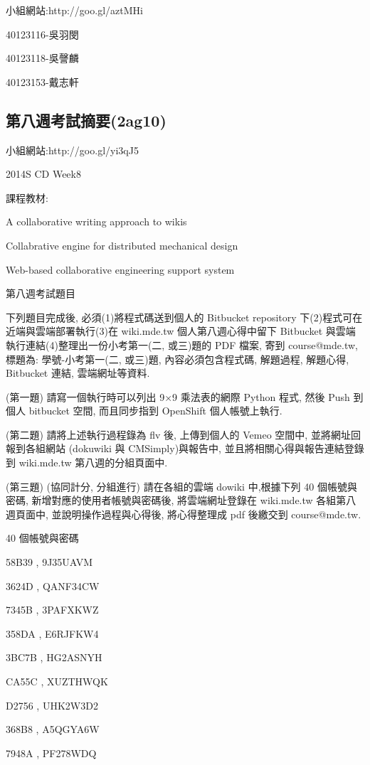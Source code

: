 \documentclass[]{article}
\begin{document}
小組網站:http://goo.gl/aztMHi

40123116-吳羽閔

40123118-吳謦麟

40123153-戴志軒

\subsection{第八週考試摘要(2ag10)}\label{ux7b2cux516bux9031ux8003ux8a66ux6458ux89812ag10}

小組網站:http://goo.gl/yi3qJ5

2014S CD Week8

課程教材:

A collaborative writing approach to wikis

Collabrative engine for distributed mechanical design

Web-based collaborative engineering support system

第八週考試題目

下列題目完成後, 必須(1)將程式碼送到個人的 Bitbucket repository
下(2)程式可在近端與雲端部署執行(3)在 wiki.mde.tw 個人第八週心得中留下
Bitbucket 與雲端執行連結(4)整理出一份小考第一(二, 或三)題的 PDF 檔案,
寄到 course@mde.tw, 標題為: 學號-小考第一(二, 或三)題,
內容必須包含程式碼, 解題過程, 解題心得, Bitbucket 連結, 雲端網址等資料.

(第一題) 請寫一個執行時可以列出 9×9 乘法表的網際 Python 程式, 然後 Push
到個人 bitbucket 空間, 而且同步指到 OpenShift 個人帳號上執行.

(第二題) 請將上述執行過程錄為 flv 後, 上傳到個人的 Vemeo 空間中,
並將網址回報到各組網站 (dokuwiki 與 CMSimply)與報告中,
並且將相關心得與報告連結登錄到 wiki.mde.tw 第八週的分組頁面中.

(第三題) (協同計分, 分組進行) 請在各組的雲端 dowiki 中,根據下列 40
個帳號與密碼, 新增對應的使用者帳號與密碼後, 將雲端網址登錄在 wiki.mde.tw
各組第八週頁面中, 並說明操作過程與心得後, 將心得整理成 pdf 後繳交到
course@mde.tw.

40 個帳號與密碼

58B39 , 9J35UAVM

3624D , QANF34CW

7345B , 3PAFXKWZ

358DA , E6RJFKW4

3BC7B , HG2ASNYH

CA55C , XUZTHWQK

D2756 , UHK2W3D2

368B8 , A5QGYA6W

7948A , PF278WDQ
\end{document}
